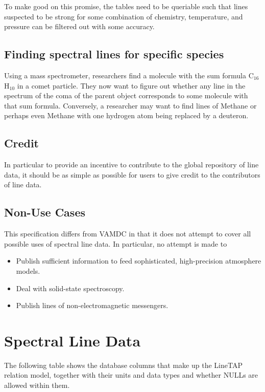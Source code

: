 \documentclass[11pt,a4paper]{ivoa}
\begin{document}
To make good on this promise, the tables need to be queriable such that
lines suspected to be strong for some combination of chemistry,
temperature, and pressure can be filtered out with some accuracy.


\subsection{Finding spectral lines for specific species}

Using a mass spectrometer, researchers find a molecule with the
sum formula C$_{16}$H$_{10}$  in a comet particle.  They now want to
figure out whether any line in the spectrum of the coma of the parent
object corresponds to some molecule with that sum formula.
Conversely, a researcher may want to find lines of Methane or perhaps
even Methane with one hydrogen atom being replaced by a deuteron.


\subsection{Credit}

In particular to provide an incentive to contribute to the global
repository of line data, it should be as simple as possible for users to
give credit to the contributors of line data.


\subsection{Non-Use Cases}

This specification differs from VAMDC in that it does not attempt to
cover all possible uses of spectral line data.  In particular, no
attempt is made to

\begin{itemize}
\item Publish sufficient information to feed sophisticated,
high-precision atmosphere models.
\item Deal with solid-state spectroscopy.
\item Publish lines of non-electromagnetic messengers.
\end{itemize}


\section{Spectral Line Data}\label{sect:quantities}

The following table shows the database columns that make up the LineTAP
relation model, together with their units and data types and whether
NULLs are allowed within them.
\end{document}

